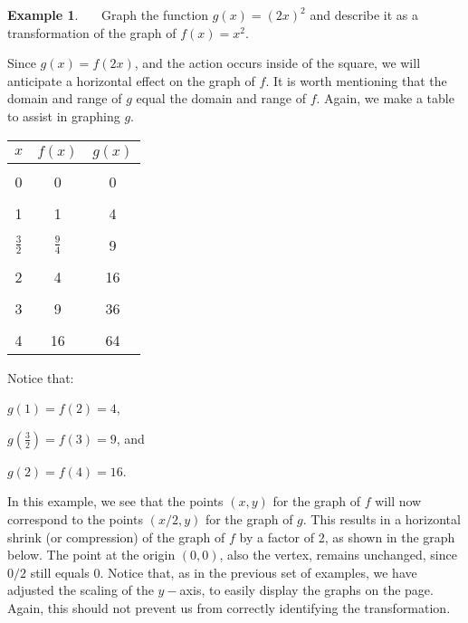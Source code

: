 \documentclass[12pt]{book}
\theoremstyle{definition}
\newtheorem{example}{Example}
\begin{document}
\begin{example}~~~Graph the function $g(x)=(2x)^2$ and describe it as a transformation of the graph of $f(x)=x^2$.\par
Since $g(x)=f(2x)$, and the action occurs inside of the square, we will anticipate a horizontal effect on the graph of $f$.  It is worth mentioning that the domain and range of $g$ equal the domain and range of $f$.  Again, we make a table to assist in graphing $g$. 
\begin{multicols}{2}
\begin{center}
\begin{tabular}{c||c|c}
$x$ & $f(x)$ &  $g(x)$ \\
\hline
&&\\
0 & 0 & 0 \\
&&\\
1 & 1 &  4 \\
&&\\
$\frac{3}{2}$ & $\frac{9}{4}$ &  9 \\
&&\\
2 & 4 &  16 \\
&&\\
3 & 9 &  36 \\
&&\\
4 & 16 & 64 
\end{tabular}
\end{center}
\columnbreak
Notice that:\par
$g(1)=f(2)=4$,\par
$g\left(\frac{3}{2}\right)=f(3)=9$, and\par
$g(2)=f(4)=16$.
\end{multicols}
In this example, we see that the points $(x,y)$ for the graph of $f$ will now correspond to the points $(x/2,y)$ for the graph of $g$.  This results in a horizontal shrink (or compression) of the graph of $f$ by a factor of 2, as shown in the graph below.  The point at the origin $(0,0)$, also the vertex, remains unchanged, since $0/2$ still equals $0$.  Notice that, as in the previous set of examples, we have adjusted the scaling of the $y-$axis, to easily display the graphs on the page.  Again, this should not prevent us from correctly identifying the transformation.    
\newpage
\begin{center}
\end{center}
\end{example}
\end{document}
